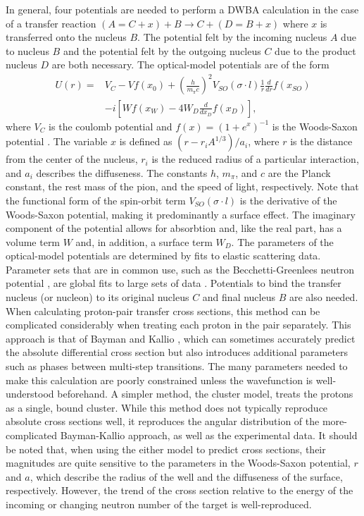 In general, four potentials are needed to perform a DWBA calculation in the case of a transfer reaction $(A = C+x)+B\rightarrow C+(D = B+x)$ where $x$ is transferred onto the nucleus $B$.  The potential felt by the incoming nucleus $A$ due to nucleus $B$ and the potential felt by the outgoing nucleus $C$ due to the product nucleus $D$ are both necessary.  The optical-model potentials are of the form
\begin{equation}
\begin{split}
U(r) = & V_C - Vf(x_0) + \left( \frac{h}{m_{\pi}c} \right) ^2 V_{SO}(\sigma\cdot l)\frac{1}{r}\frac{d}{dr}f(x_{SO}) \\
 & -i[Wf(x_W) - 4W_D\frac{d}{dx_D}f(x_D)],
\end{split}
\end{equation}
where $V_C$ is the coulomb potential and $f(x)=(1+e^x)^{-1}$ is the Woods-Saxon potential \citep{PereyPerey}.  The variable $x$ is defined as $(r-r_iA^{1/3})/a_i$, where $r$ is the distance from the center of the nucleus, $r_i$ is the reduced radius of a particular interaction, and $a_i$ describes the diffuseness.  The constants $h$, $m_{\pi}$, and $c$ are the Planck constant, the rest mass of the pion, and the speed of light, respectively.  Note that the functional form of the spin-orbit term $V_{SO}(\sigma\cdot l)$ is the derivative of the Woods-Saxon potential, making it predominantly a surface effect.  The imaginary component of the potential allows for absorbtion and, like the real part, has a volume term $W$ and, in addition, a surface term $W_D$.  The parameters of the optical-model potentials are determined by fits to elastic scattering data.  Parameter sets that are in common use, such as the Becchetti-Greenlees neutron potential \citep{Becchetti_neutronPotential}, are global fits to large sets of data \citep{PereyPerey}.  Potentials to bind the transfer nucleus (or nucleon) to its original nucleus $C$ and final nucleus $B$ are also needed. 
When calculating proton-pair transfer cross sections, this method can be complicated considerably when treating each proton in the pair separately.  This approach is that of Bayman and Kallio \citep{BaymanKallio}, which can sometimes accurately predict the absolute differential cross section but also introduces additional parameters such as phases between multi-step transitions.  The many parameters needed to make this calculation are poorly constrained unless the wavefunction is well-understood beforehand.  A simpler method, the cluster model, treats the protons as a single, bound cluster.  While this method does not typically reproduce absolute cross sections well, it reproduces the angular distribution of the more-complicated Bayman-Kallio approach, as well as the experimental data.  It should be noted that, when using the either model to predict cross sections, their magnitudes are quite sensitive to the parameters in the Woods-Saxon potential, $r$ and $a$, which describe the radius of the well and the diffuseness of the surface, respectively.  However, the trend of the cross section relative to the energy of the incoming  or changing neutron number of the target is well-reproduced.


